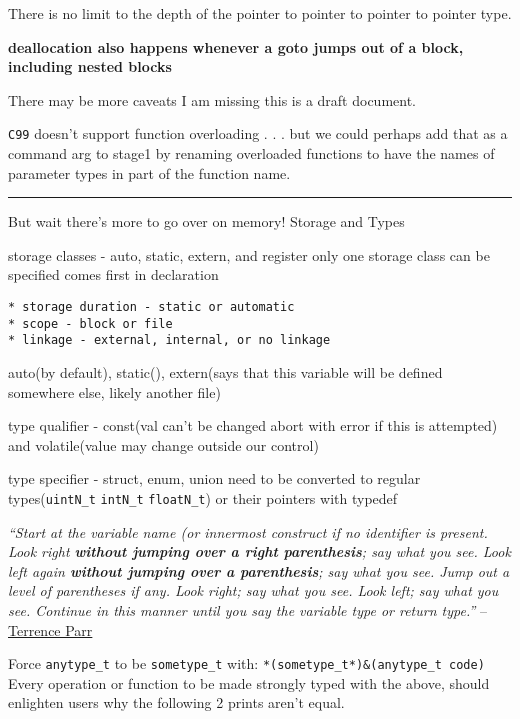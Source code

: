 There is no limit to the depth of the pointer to pointer to pointer to
pointer type.

\textbf{deallocation also happens whenever a goto jumps out of a block,
including nested blocks}

There may be more caveats I am missing this is a draft document.

\texttt{C99} doesn't support function overloading . . . but we could
perhaps add that as a command arg to stage1 by renaming overloaded
functions to have the names of parameter types in part of the function
name.

\begin{center}\rule{0.5\linewidth}{0.5pt}\end{center}

But wait there's more to go over on memory! Storage and Types

storage classes - auto, static, extern, and register only one storage
class can be specified comes first in declaration

\begin{verbatim}
* storage duration - static or automatic
* scope - block or file
* linkage - external, internal, or no linkage
\end{verbatim}

auto(by default), static(), extern(says that this variable will be
defined somewhere else, likely another file)

type qualifier - const(val can't be changed abort with error if this is
attempted) and volatile(value may change outside our control)

type specifier - struct, enum, union need to be converted to regular
types(\texttt{uintN\_t} \texttt{intN\_t} \texttt{floatN\_t}) or their
pointers with typedef

\emph{``Start at the variable name (or innermost construct if no
identifier is present. Look right \textbf{without jumping over a right
parenthesis}; say what you see. Look left again \textbf{without jumping
over a parenthesis}; say what you see. Jump out a level of parentheses
if any. Look right; say what you see. Look left; say what you see.
Continue in this manner until you say the variable type or return
type.''}
--\href{https://parrt.cs.usfca.edu/doc/how-to-read-C-declarations.html}{Terrence
Parr}

Force \texttt{anytype\_t} to be \texttt{sometype\_t} with:
\texttt{*(sometype\_t*)\&(anytype\_t\ code)} Every operation or function
to be made strongly typed with the above, should enlighten users why the
following 2 prints aren't equal.

